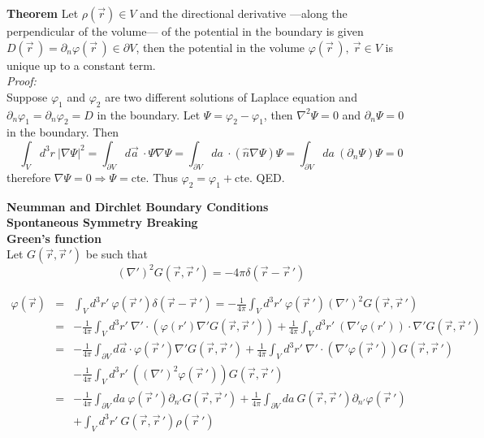 \documentclass[12pt,a4paper]{article}
\newcommand{\integral}[3]{\int_{#1}^{#2} d #3 \ } %
\begin{document}
\textbf{Theorem} Let $\rho(\vec{r}) \in V$ and the directional derivative ---along the perpendicular of the volume--- of the potential in the boundary is given $D(\vec{r}\,)=\partial_n\varphi(\vec{r} \,) \in \partial V$, then the potential in the volume $\varphi(\vec{r}\,), \  \vec{r} \in  V$ is unique up to a constant term. \\
\textit{Proof: }\\
Suppose $\varphi_1$ and $\varphi_2$ are two different solutions of Laplace equation and $\partial_n\varphi_1 = \partial_n\varphi_2 =D$ in the boundary. Let $\Psi = \varphi_2-\varphi_1$, then $\nabla^2 \Psi = 0$  and  $\partial_n\Psi = 0$ in the boundary. Then
\begin{equation}
	\integral{V}{}{^3r} |\nabla \Psi|^2 = \integral{\partial V}{}{ \vec{a}} \cdot \Psi\nabla \Psi =\integral{\partial V}{}{a} \cdot (\hat{n}\nabla \Psi)\Psi =\integral{\partial V}{}{a} (\partial_n \Psi)\Psi = 0 
\end{equation}
therefore $\nabla \Psi = 0 \Rightarrow \Psi = \text{cte.}$  Thus $\varphi_2 = \varphi_1 + \text{cte.}$ QED.

\textbf{Neumman and Dirchlet Boundary Conditions}\\

\textbf{Spontaneous Symmetry Breaking}\\


\textbf{Green's function}\\
Let $G(\vec{r},\vec{r}\,')$ be such that
\begin{equation}
	(\nabla')^2 G(\vec{r},\vec{r}\,') = -4\pi \delta (\vec{r}-\vec{r}\,')
\end{equation}

\begin{eqnarray}
	\varphi(\vec{r}) & = & \integral{V}{}{^3r'}\varphi(\vec{r}\,')\delta(\vec{r}-\vec{r}\,') = -\frac{1}{4\pi}\integral{V}{}{^3r'} \varphi(\vec{r}\,')(\nabla')^2 G(\vec{r},\vec{r}\,')\nonumber\\
	& = & -\frac{1}{4\pi}\integral{V}{}{^3r'} \nabla'\cdot \left( \varphi(r') \nabla' G(\vec{r},\vec{r}\,')\right) + \frac{1}{4\pi}\integral{V}{}{^3r'} (\nabla' \varphi(r'))\cdot \nabla' G(\vec{r},\vec{r}\,') \nonumber\\
	& = & -\frac{1}{4\pi} \int_{\partial V}d\vec{a} \cdot \varphi(\vec{r}\,')\nabla'G(\vec{r},\vec{r}\,') + \frac{1}{4\pi}\integral{V}{}{^3r'}\nabla'\cdot(\nabla'\varphi(\vec{r}\,'))G(\vec{r},\vec{r}\,')\nonumber\\
	& & -\frac{1}{4\pi}\integral{V}{}{^3r'}((\nabla')^2\varphi(\vec{r}\,')) G(\vec{r},\vec{r}\,')\\
	& = & -\frac{1}{4\pi} \integral{\partial V}{}{a}  \varphi(\vec{r}\,')\partial_{n'}G(\vec{r},\vec{r}\,') + \frac{1}{4\pi}\integral{\partial V}{}{a}G(\vec{r},\vec{r}\,')\partial_{n'}\varphi (\vec{r}\,') \\
	& & + \integral{V}{}{^3r'} G(\vec{r},\vec{r}\,') \rho(\vec{r}\,')
\end{eqnarray}
\end{document}
